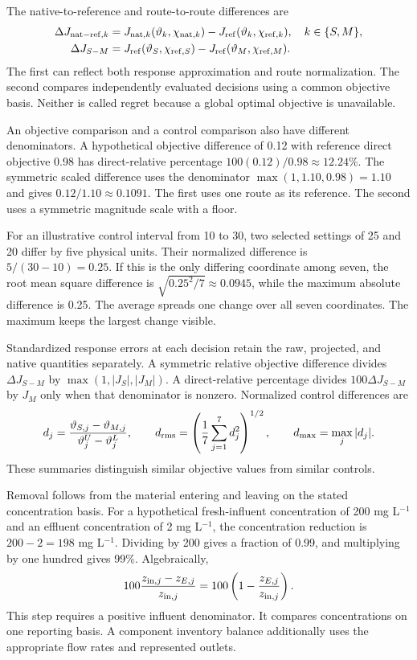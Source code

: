 The native-to-reference and route-to-route differences are
\begin{align}
\Delta J_{{\rm nat-ref},k}&=
J_{{\rm nat},k}(\vartheta_k,\chi_{{\rm nat},k})
-J_{\rm ref}(\vartheta_k,\chi_{{\rm ref},k}),\quad k\in\{S,M\},\\
\Delta J_{S-M}&=J_{\rm ref}(\vartheta_S,\chi_{{\rm ref},S})
-J_{\rm ref}(\vartheta_M,\chi_{{\rm ref},M}).
\label{eq:plant_objective_comparison}
\end{align}
The first can reflect both response approximation and route normalization. The second compares independently evaluated decisions using a common objective basis. Neither is called regret because a global optimal objective is unavailable.

An objective comparison and a control comparison also have different denominators. A hypothetical objective difference of 0.12 with reference direct objective 0.98 has direct-relative percentage $100(0.12)/0.98\approx12.24\%$. The symmetric scaled difference uses the denominator $\max(1,1.10,0.98)=1.10$ and gives $0.12/1.10\approx0.1091$. The first uses one route as its reference. The second uses a symmetric magnitude scale with a floor.

For an illustrative control interval from 10 to 30, two selected settings of 25 and 20 differ by five physical units. Their normalized difference is $5/(30-10)=0.25$. If this is the only differing coordinate among seven, the root mean square difference is $\sqrt{0.25^2/7}\approx0.0945$, while the maximum absolute difference is 0.25. The average spreads one change over all seven coordinates. The maximum keeps the largest change visible.

Standardized response errors at each decision retain the raw, projected, and native quantities separately. A symmetric relative objective difference divides $\Delta J_{S-M}$ by $\max(1,|J_S|,|J_M|)$. A direct-relative percentage divides $100\Delta J_{S-M}$ by $J_M$ only when that denominator is nonzero. Normalized control differences are
\begin{equation}
d_j=\frac{\vartheta_{S,j}-\vartheta_{M,j}}{\vartheta_j^U-\vartheta_j^L},\qquad
d_{\rm rms}=\left(\frac17\sum_{j=1}^7d_j^2\right)^{1/2},\qquad
d_{\max}=\max_j|d_j|.
\end{equation}
These summaries distinguish similar objective values from similar controls.

Removal follows from the material entering and leaving on the stated concentration basis. For a hypothetical fresh-influent concentration of 200 mg L$^{-1}$ and an effluent concentration of 2 mg L$^{-1}$, the concentration reduction is $200-2=198$ mg L$^{-1}$. Dividing by 200 gives a fraction of 0.99, and multiplying by one hundred gives 99\%. Algebraically,
\[
100\frac{z_{{\rm in},j}-z_{E,j}}{z_{{\rm in},j}}
=100\left(1-\frac{z_{E,j}}{z_{{\rm in},j}}\right).
\]
This step requires a positive influent denominator. It compares concentrations on one reporting basis. A component inventory balance additionally uses the appropriate flow rates and represented outlets.

